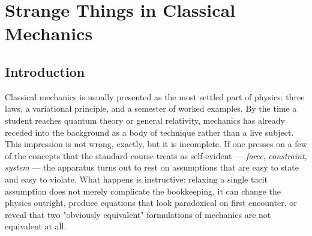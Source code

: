 %
%

\chapter{Strange Things in Classical Mechanics}
\label{chap:strange-classical-mechanics}

\section{Introduction}
\label{sec:strange-cm-intro}

Classical mechanics is usually presented as the most settled part of
physics: three laws, a variational principle, and a semester of
worked examples. By the time a student reaches quantum theory or
general relativity, mechanics has already receded into the
background as a body of technique rather than a live subject. This
impression is not wrong, exactly, but it is incomplete. If one
presses on a few of the concepts that the standard course treats as
self-evident --- \emph{force}, \emph{constraint}, \emph{system} ---
the apparatus turns out to rest on assumptions that are easy to
state and easy to violate. What happens is instructive: relaxing a
single tacit assumption does not merely complicate the bookkeeping,
it can change the physics outright, produce equations that look
paradoxical on first encounter, or reveal that two "obviously
equivalent" formulations of mechanics are not equivalent at all.

